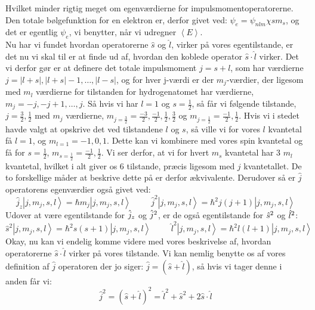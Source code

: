 \documentclass[../../Atom-ogMolekylefysik.tex]{subfiles}
\begin{document}
Hvilket minder rigtig meget om egenværdierne for impulsmomentoperatorerne. Den totale bølgefunktion for en elektron er, derfor givet ved:
$\psi_e=\psi_{nlm}\chi{sm_s}$, og det er egentlig $\psi_e$, vi benytter, når vi udregner $\left<E\right>$. \\
Nu har vi fundet hvordan operatorerne $\hat{s}$ og $\hat{l}$, virker på vores egentilstande, er det nu vi skal til er at finde ud af, hvordan den koblede operator $\hat{s}\cdot\hat{l}$ virker. Det vi derfor gør er at definere det totale impulsmoment $j=s+l$, som har værdierne $j=|l+s|, |l+s|-1, \ldots, |l-s|$, og for hver j-værdi er der $m_j$-værdier, der ligesom med $m_l$ værdierne for tilstanden for hydrogenatomet har værdierne, $m_{j}=-j, -j+1, \ldots , j$. Så hvis vi har $l=1$ og $s=\frac{1}{2}$, så får vi følgende tilstande, $j=\frac{3}{2}, \frac{1}{2}$ med $m_j$ værdierne, $m_{j=\frac{3}{2}}=\frac{-3}{2}, \frac{-1}{2},\frac{1}{2},\frac{3}{2}$ og $m_{j=\frac{1}{2}}=\frac{-1}{2},\frac{1}{2}$.
Hvis vi i stedet havde valgt at opskrive det ved tilstandene $l$ og $s$, så ville vi for vores $l$ kvantetal få $l=1$, og $m_{l=1}=-1, 0, 1$. Dette kan vi kombinere med vores spin kvantetal og få for $s=\frac{1}{2}$, $m_{s=\frac{1}{2}}=\frac{-1}{2}, \frac{1}{2}$. Vi ser derfor, at vi for hvert $m_s$ kvantetal har 3 $m_l$ kvantetal, hvilket i alt giver os 6 tilstande, præcis ligesom med $j$ kvantetallet. De to forskellige måder at beskrive dette på er derfor ækvivalente. Derudover så er $\hat{j}$ operatorens egenværdier også givet ved:
\begin{equation}
    \hat{j}_z\left|j, m_j, s, l\right>=\hbar m_j\left|j, m_j, s, l\right> \hspace{1cm} \hat{j}^2\left|j, m_j, s, l\right>=\hbar^2 j(j+1)\left|j, m_j, s, l\right>
\end{equation}
Udover at være egentilstande for $\hat j_z$ og $\hat j^2$, er de også egentilstande for $\hat s^2$ og $\hat l^2$:
\begin{equation}
    \hat{s}^2\left|j, m_j, s, l\right>=\hbar^2 s(s+1)\left|j, m_j, s, l\right>\hspace{1cm}\hat{l}^2\left|j, m_j, s, l\right>=\hbar^2 l(l+1)\left|j, m_j, s, l\right>
\end{equation}
Okay, nu kan vi endelig komme videre med vores beskrivelse af, hvordan operatorerne $\hat{s}\cdot\hat{l}$ virker på vores tilstande. Vi kan nemlig benytte os af vores definition af $\hat{j}$ operatoren der jo siger: $\hat{j}=(\hat{s}+\hat{l})$, så hvis vi tager denne i anden får vi: 
\begin{equation}
    \hat{j}^2=(\hat{s}+\hat{l})^2=\hat{l}^2+\hat{s}^2+2\hat{s}\cdot\hat{l}
\end{equation}
\end{document}
